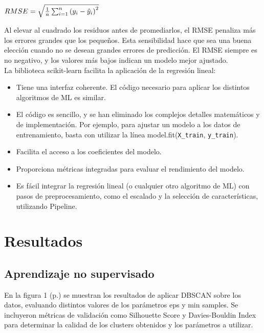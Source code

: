 \documentclass{article}
\begin{document}
{\begin{math}
RMSE=\sqrt{\frac{1}{n} \sum_{i=1}^{n} \left( y_i - \hat{y}_i \right)^2} \\
\end{math}

Al elevar al cuadrado los residuos antes de promediarlos, el RMSE penaliza más los errores grandes que los pequeños. Esta sensibilidad hace que sea una buena elección cuando no se desean grandes errores de predicción. El RMSE siempre es no negativo, y los valores más bajos indican un modelo mejor ajustado.\\

La biblioteca scikit-learn facilita la aplicación de la regresión lineal:
\begin{itemize}
\item Tiene una interfaz coherente. El código necesario para aplicar los distintos algoritmos de ML es similar.
\item El código es sencillo, y se han eliminado los complejos detalles matemáticos y de implementación. Por ejemplo, para ajustar un modelo a los datos de entrenamiento, basta con utilizar la línea model.fit(\texttt{X\_train}, \texttt{y\_train}).
\item Facilita el acceso a los coeficientes del modelo.
\item Proporciona métricas integradas para evaluar el rendimiento del modelo.
\item Es fácil integrar la regresión lineal (o cualquier otro algoritmo de ML) con pasos de preprocesamiento, como el escalado y la selección de características, utilizando Pipeline.
\end{itemize}



\section{Resultados}

\subsection{Aprendizaje no supervisado}
En la figura 1 (p.\pageref{fig:resultado}) se muestran los resultados de aplicar DBSCAN sobre los datos, evaluando distintos valores de los parámetros eps y min samples. Se incluyeron métricas de validación  como Silhouette Score y Davies-Bouldin Index para determinar la calidad de los clusters obtenidos y los parámetros a utilizar.

}
\end{document}

